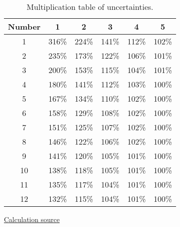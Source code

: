 \begin{table}[htb]
    \centering
    \begin{tabular}{c|ccccc}
        \textbf{Number} & \textbf{1} & \textbf{2} & \textbf{3} & \textbf{4} & \textbf{5} \\ \hline
        1 & 316\% & 224\% & 141\% & 112\% & 102\% \\
        2 & 235\% & 173\% & 122\% & 106\% & 101\% \\
        3 & 200\% & 153\% & 115\% & 104\% & 101\% \\
        4 & 180\% & 141\% & 112\% & 103\% & 100\% \\
        5 & 167\% & 134\% & 110\% & 102\% & 100\% \\
        6 & 158\% & 129\% & 108\% & 102\% & 100\% \\
        7 & 151\% & 125\% & 107\% & 102\% & 100\% \\
        8 & 146\% & 122\% & 106\% & 102\% & 100\% \\
        9 & 141\% & 120\% & 105\% & 101\% & 100\% \\
        10 & 138\% & 118\% & 105\% & 101\% & 100\% \\
        11 & 135\% & 117\% & 104\% & 101\% & 100\% \\
        12 & 132\% & 115\% & 104\% & 101\% & 100\% \\
    \end{tabular}
    \caption{Multiplication table of uncertainties.}
    \label{table:more_uncertainties}
\end{table}

\href{https://docs.google.com/spreadsheets/d/e/2PACX-1vTSial-WTQY0PDA2uLyeZGWxRKeqSEUTQ8Ir32RFY4fW93_aPfC6aD6Loooz6PsjEhB5QSiTCRI1nUo/pubhtml}{Calculation source}
